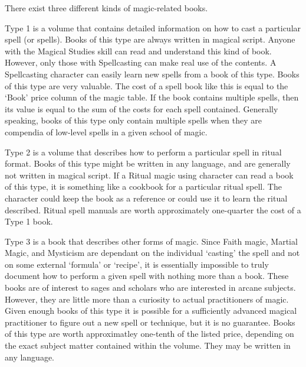 \documentclass[twoside]{book}
\begin{document}
    {  
      There exist three different kinds of magic-related
               books. 
    }
  
    {  
      Type 1 is a volume that contains detailed
               information on how to cast a particular spell (or spells).
               Books of this type are always written in magical script.
               Anyone with the Magical Studies skill can read and
               understand this kind of book. However, only those with
               Spellcasting can make real use of the contents. A
               Spellcasting character can easily learn new spells from a
               book of this type. Books of this type are very valuable.
               The cost of a spell book like this is equal to the
               `Book' price column of the magic table. If the
               book contains multiple spells, then its value is equal to
               the sum of the costs for each spell contained. Generally
               speaking, books of this type only contain multiple spells
               when they are compendia of low-level spells in a given
               school of magic. 
    }
  
    {  
      Type 2 is a volume that describes how to perform a
               particular spell in ritual format. Books of this type
               might be written in any language, and are generally not
               written in magical script. If a Ritual magic using
               character can read a book of this type, it is something
               like a cookbook for a particular ritual spell. The
               character could keep the book as a reference or could use
               it to learn the ritual described. Ritual spell manuals are
               worth approximately one-quarter the cost of a Type 1 book.
               
    }
  
    {  
      Type 3 is a book that describes other forms of
               magic. Since Faith magic, Martial Magic, and Mysticism are
               dependant on the individual `casting' the
               spell and not on some external `formula' or
               `recipe', it is essentially impossible to
               truly document how to perform a given spell with nothing
               more than a book. These books are of interest to sages and
               scholars who are interested in arcane subjects. However,
               they are little more than a curiosity to actual
               practitioners of magic. Given enough books of this type it
               is possible for a sufficiently advanced magical
               practitioner to figure out a new spell or technique, but
               it is no guarantee. Books of this type are worth
               approximatley one-tenth of the listed price, depending on
               the exact subject matter contained within the volume. They
               may be written in any language. 
    }
  
\end{document}

